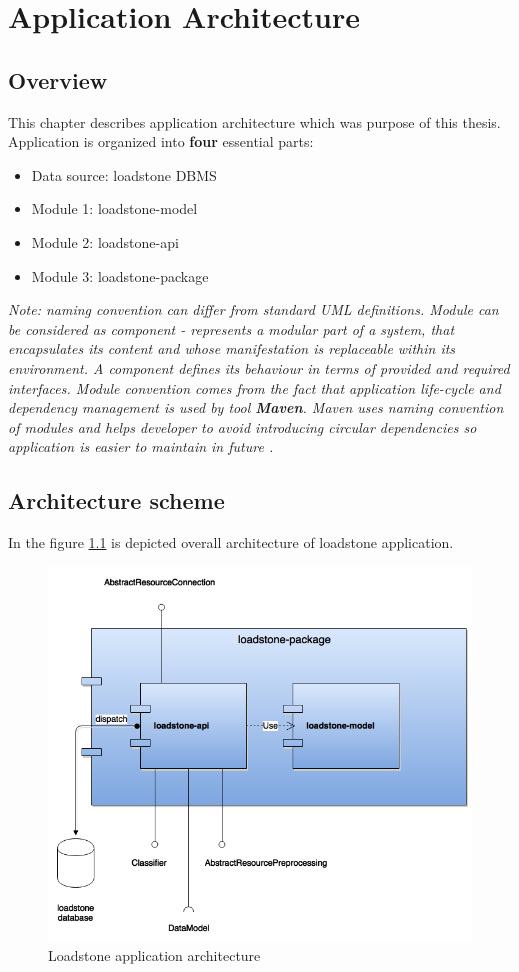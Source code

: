 \chapter{Application Architecture}
\section{Overview}
This chapter describes application architecture which was purpose of this thesis. Application is organized into \textbf{four} essential parts:
\begin{itemize}
	\item Data source: loadstone DBMS
	\item Module 1: loadstone-model
	\item Module 2: loadstone-api
	\item Module 3: loadstone-package
\end{itemize}

\textit{Note: naming convention can differ from standard UML definitions. Module can be considered as component - represents a modular part of a system, that encapsulates its content and whose manifestation is replaceable within its environment. A component defines its behaviour in terms of provided and required interfaces\cite{22}. Module convention comes from the fact that application life-cycle and dependency management is used by tool \textbf{Maven}. Maven uses naming convention of modules and helps developer to avoid introducing circular dependencies so application is easier to maintain in future \cite{23}.}

\section{Architecture scheme}
In the figure \ref{fig:@=architecture} is depicted overall architecture of loadstone application.
\begin{figure}
	\centering
	\includegraphics[scale=0.6]{architecture.png}
	\caption{Loadstone application architecture}
	\label{fig:@=architecture}
\end{figure}

